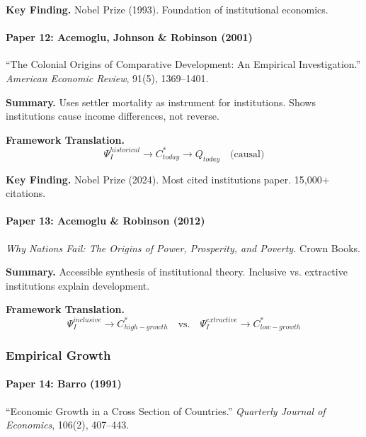 \textbf{Key Finding.}
Nobel Prize (1993). Foundation of institutional economics.

\paragraph{Paper 12: Acemoglu, Johnson \& Robinson (2001)}

``The Colonial Origins of Comparative Development: An Empirical Investigation.''
\textit{American Economic Review}, 91(5), 1369--1401.

\textbf{Summary.}
Uses settler mortality as instrument for institutions. Shows institutions 
cause income differences, not reverse.

\textbf{Framework Translation.}
\begin{equation}
\Psi_I^{historical} \to C^*_{today} \to Q_{today} \quad \text{(causal)}
\end{equation}

\textbf{Key Finding.}
Nobel Prize (2024). Most cited institutions paper. 15,000+ citations.

\paragraph{Paper 13: Acemoglu \& Robinson (2012)}

\textit{Why Nations Fail: The Origins of Power, Prosperity, and Poverty.}
Crown Books.

\textbf{Summary.}
Accessible synthesis of institutional theory. Inclusive vs. extractive 
institutions explain development.

\textbf{Framework Translation.}
\begin{equation}
\Psi_I^{inclusive} \to C^*_{high-growth} \quad \text{vs.} \quad 
\Psi_I^{extractive} \to C^*_{low-growth}
\end{equation}

\subsubsection{Empirical Growth}

\paragraph{Paper 14: Barro (1991)}

``Economic Growth in a Cross Section of Countries.''
\textit{Quarterly Journal of Economics}, 106(2), 407--443.

